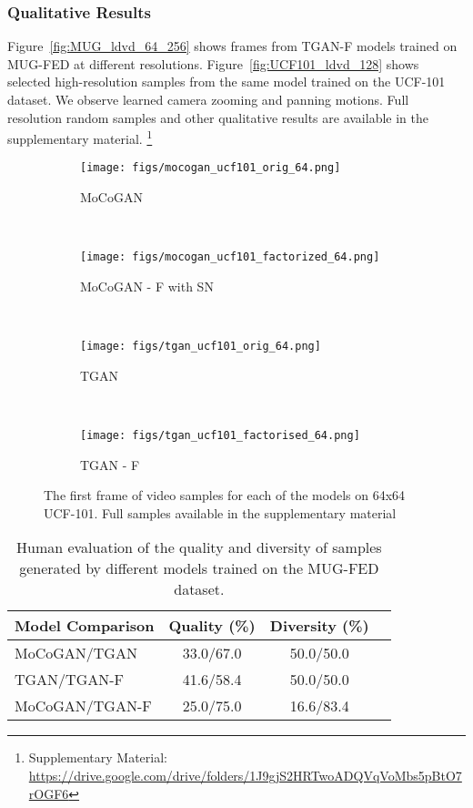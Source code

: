 \documentclass[a4paper,fleqn]{cas-sc}
\begin{document}
\subsubsection{Qualitative Results}

Figure~\ref{fig:MUG_ldvd_64_256} shows frames from TGAN-F models trained on MUG-FED at different resolutions. Figure~\ref{fig:UCF101_ldvd_128} shows selected high-resolution samples from the same model trained on the UCF-101 dataset. We observe learned camera zooming and panning motions. Full resolution random samples and other qualitative results are available in the supplementary material. \footnote{Supplementary Material: \url{https://drive.google.com/drive/folders/1J9gjS2HRTwoADQVqVoMbs5pBtO7rOGF6}}

\begin{figure}[pos=!h]
    \centering
    \begin{subfigure}[t]{0.5\textwidth}
        \centering
        \texttt{[image: figs/mocogan\_ucf101\_orig\_64.png]}
        \caption{MoCoGAN}
        \label{fig:mocogan_samples_ucf101_64}
    \end{subfigure}~
    \begin{subfigure}[t]{0.5\textwidth}
        \centering
        \texttt{[image: figs/mocogan\_ucf101\_factorized\_64.png]}
        \caption{MoCoGAN - F with SN}
        \label{fig:mocoganf_samples_ucf101_64}
    \end{subfigure}\\
    \begin{subfigure}[t]{0.5\textwidth}
        \centering
        \texttt{[image: figs/tgan\_ucf101\_orig\_64.png]}
        \caption{TGAN}
        \label{fig:tgan_samples_ucf101_64}
    \end{subfigure}~
    \begin{subfigure}[t]{0.5\textwidth}
        \centering
        \texttt{[image: figs/tgan\_ucf101\_factorised\_64.png]}
        \caption{TGAN - F}
        \label{fig:tganf_samples_ucf101_64}
    \end{subfigure}
    \caption{The first frame of video samples for each of the models on 64x64 UCF-101. Full samples available in the supplementary material}\label{fig:ucf101_samples_64}
\end{figure}

\begin{table}[pos=!h]
\caption{Human evaluation of the quality and diversity of samples generated by different models trained on the MUG-FED dataset.}
\label{table:human_eval}
    \begin{tabular}{lccc}
    \hline Model Comparison      &     Quality (\%)   &  Diversity (\%)  \\
    \hline
    MoCoGAN/TGAN          &      33.0/67.0     &    50.0/50.0   \\
    TGAN/TGAN-F           &      41.6/58.4     &    50.0/50.0       \\
    MoCoGAN/TGAN-F        &      25.0/75.0     &    16.6/83.4   \\
    \hline \end{tabular}
\end{table}
\end{document}
